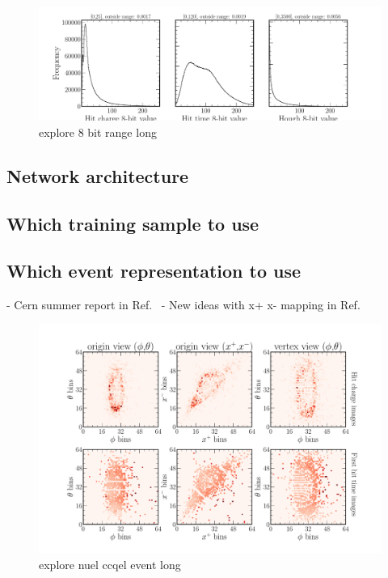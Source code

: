 \begin{figure} %
    \includegraphics[width=\textwidth]{diagrams/7-cvn/chipsnet/expore_8_bit_range.pdf}
    \caption[explore 8 bit range short]
    {explore 8 bit range long}
    \label{fig:explore_8_bit_range}
\end{figure}

\subsection{Network architecture} %
\label{sec:cvn_baseline_architecture} %

\subsection{Which training sample to use} %
\label{sec:cvn_baseline_sample} %

\subsection{Which event representation to use} %
\label{sec:cvn_baseline_repr} %

- Cern summer report in Ref.~\cite{theodore2016}
- New ideas with x+ x- mapping in Ref.~\cite{berns2020}

\begin{figure} %
    \includegraphics[width=\textwidth]{diagrams/7-cvn/chipsnet/explore_nuel_ccqel_event.pdf}
    \caption[explore nuel ccqel event short]
    {explore nuel ccqel event long}
    \label{fig:explore_nuel_ccqel_event}
\end{figure}

